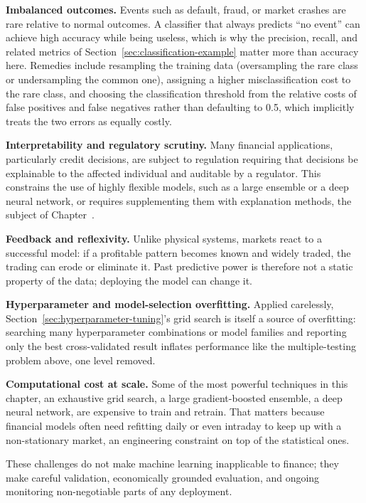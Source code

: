 \documentclass[../ai_in_finance]{subfiles}
\begin{document}
\textbf{Imbalanced outcomes.} Events such as default, fraud, or market crashes are rare relative to normal outcomes. A classifier that always predicts ``no event'' can achieve high accuracy while being useless, which is why the precision, recall, and related metrics of Section~\ref{sec:classification-example} matter more than accuracy here. Remedies include resampling the training data (oversampling the rare class or undersampling the common one), assigning a higher misclassification cost to the rare class, and choosing the classification threshold from the relative costs of false positives and false negatives rather than defaulting to 0.5, which implicitly treats the two errors as equally costly.

\textbf{Interpretability and regulatory scrutiny.} Many financial applications, particularly credit decisions, are subject to regulation requiring that decisions be explainable to the affected individual and auditable by a regulator. This constrains the use of highly flexible models, such as a large ensemble or a deep neural network, or requires supplementing them with explanation methods, the subject of Chapter~.

\textbf{Feedback and reflexivity.} Unlike physical systems, markets react to a successful model: if a profitable pattern becomes known and widely traded, the trading can erode or eliminate it. Past predictive power is therefore not a static property of the data; deploying the model can change it.

\textbf{Hyperparameter and model-selection overfitting.} Applied carelessly, Section~\ref{sec:hyperparameter-tuning}'s grid search is itself a source of overfitting: searching many hyperparameter combinations or model families and reporting only the best cross-validated result inflates performance like the multiple-testing problem above, one level removed.

\textbf{Computational cost at scale.} Some of the most powerful techniques in this chapter, an exhaustive grid search, a large gradient-boosted ensemble, a deep neural network, are expensive to train and retrain. That matters because financial models often need refitting daily or even intraday to keep up with a non-stationary market, an engineering constraint on top of the statistical ones.

These challenges do not make machine learning inapplicable to finance; they make careful validation, economically grounded evaluation, and ongoing monitoring non-negotiable parts of any deployment.
\end{document}
